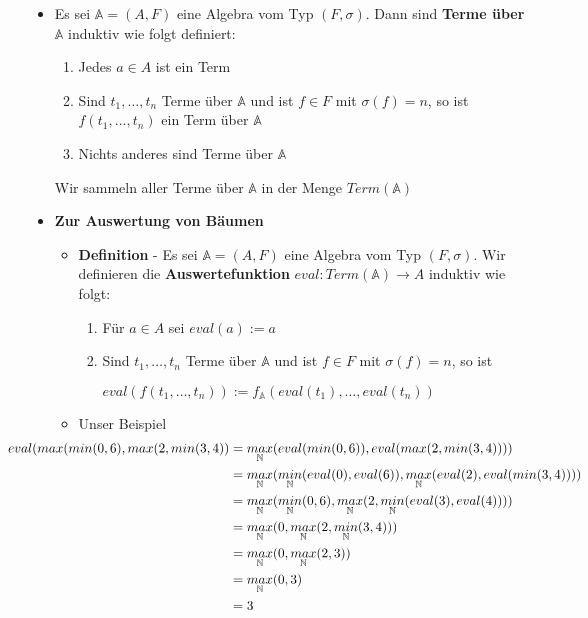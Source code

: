 \documentclass[12pt, a4paper]{article}
\begin{document}
\begin{itemize}
		
		\item Es sei $\mathbb{A}=(A,F)$ eine Algebra vom Typ $(F,\sigma)$. 
			\subitem Dann sind \textbf{Terme über $\mathbb{A}$} induktiv wie folgt definiert:
			\begin{enumerate}
				\item  Jedes $a\in A$ ist ein Term
				
				\item Sind $t_{1},\dots,t_{n}$ Terme über $\mathbb{A}$ und ist $f\in F$ mit $\sigma(f)=n$, so ist $f(t_{1},\dots,t_{n})$ ein Term über $\mathbb{A}$
				
				\item Nichts anderes sind Terme über $\mathbb{A}$
			\end{enumerate}
			\subitem Wir sammeln aller Terme über $\mathbb{A}$ in der Menge $Term(\mathbb{A})$
		
		
		\item \textbf{Zur Auswertung von Bäumen}
		\begin{itemize}
			\item \textbf{Definition} - Es sei $\mathbb{A}=(A,F)$ eine Algebra vom Typ $(F,\sigma)$. Wir definieren die \textbf{Auswertefunktion} $eval:Term(\mathbb{A})\rightarrow A$ induktiv wie folgt:
			\begin{enumerate}
				\item Für $a\in A$ sei $eval(a):=a$
				\item Sind $t_{1},\dots,t_{n}$ Terme über $\mathbb{A}$ und ist $f\in F$ mit $\sigma(f)=n$, so ist
				\begin{center}
					$eval(f(t_{1},\dots,t_{n})):=f_{\mathbb{A}}(eval(t_{1}),\dots,eval(t_{n}))$
				\end{center}
			\end{enumerate}
			\item Unser Beispiel
			\begin{align*}\hspace{-.75in}
			eval(max(min(0, 6), max(2, min(3, 4)) &=\underset{\mathbb{N}}{max}(eval(min(0, 6)), eval(max(2, min(3, 4))))	\\
			&= \underset{\mathbb{N}}{max}(\underset{\mathbb{N}}{min}(eval(0), eval(6)),\underset{\mathbb{N}}{max}(eval(2), eval(min(3, 4))))	\\
			&=\underset{\mathbb{N}}{max}(\underset{\mathbb{N}}{min}(0,6),\underset{\mathbb{N}}{max}(2,\underset{\mathbb{N}}{min}(eval(3), eval(4))))	\\
			&=\underset{\mathbb{N}}{max}(0,\underset{\mathbb{N}}{max}(2,\underset{\mathbb{N}}{min}(3, 4)))	\\
			&=\underset{\mathbb{N}}{max}(0,\underset{\mathbb{N}}{max}(2, 3))	\\
			&=\underset{\mathbb{N}}{max}(0, 3)	\\
			&=3
			\end{align*}
		\end{itemize}
		

\end{itemize}
\end{document}
